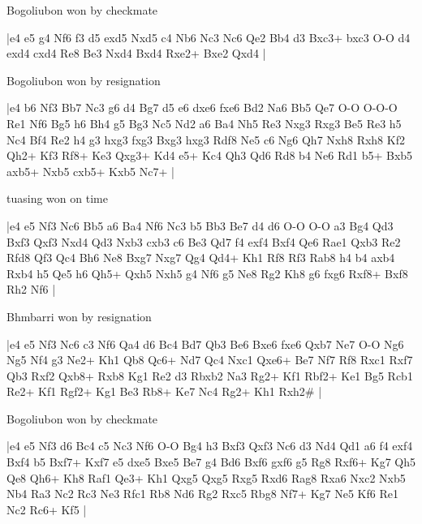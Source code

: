 \showboard

Bogoliubon won by checkmate

\makegametitle
|e4 e5 g4 Nf6 f3 d5 exd5 Nxd5 c4 Nb6 Nc3 Nc6 Qe2 Bb4 d3 Bxc3+ bxc3 O-O d4 exd4 cxd4 Re8 Be3 Nxd4 Bxd4 Rxe2+ Bxe2 Qxd4  |

\showboard

Bogoliubon won by resignation

\makegametitle
|e4 b6 Nf3 Bb7 Nc3 g6 d4 Bg7 d5 e6 dxe6 fxe6 Bd2 Na6 Bb5 Qe7 O-O O-O-O Re1 Nf6 Bg5 h6 Bh4 g5 Bg3 Nc5 Nd2 a6 Ba4 Nh5 Re3 Nxg3 Rxg3 Be5 Re3 h5 Nc4 Bf4 Re2 h4 g3 hxg3 fxg3 Bxg3 hxg3 Rdf8 Ne5 c6 Ng6 Qh7 Nxh8 Rxh8 Kf2 Qh2+ Kf3 Rf8+ Ke3 Qxg3+ Kd4 e5+ Kc4 Qh3 Qd6 Rd8 b4 Ne6 Rd1 b5+ Bxb5 axb5+ Nxb5 cxb5+ Kxb5 Nc7+  |

\showboard

tuasing won on time

\makegametitle
|e4 e5 Nf3 Nc6 Bb5 a6 Ba4 Nf6 Nc3 b5 Bb3 Be7 d4 d6 O-O O-O a3 Bg4 Qd3 Bxf3 Qxf3 Nxd4 Qd3 Nxb3 cxb3 c6 Be3 Qd7 f4 exf4 Bxf4 Qe6 Rae1 Qxb3 Re2 Rfd8 Qf3 Qc4 Bh6 Ne8 Bxg7 Nxg7 Qg4 Qd4+ Kh1 Rf8 Rf3 Rab8 h4 b4 axb4 Rxb4 h5 Qe5 h6 Qh5+ Qxh5 Nxh5 g4 Nf6 g5 Ne8 Rg2 Kh8 g6 fxg6 Rxf8+ Bxf8 Rh2 Nf6  |

\showboard

Bhmbarri won by resignation

\makegametitle
|e4 e5 Nf3 Nc6 c3 Nf6 Qa4 d6 Bc4 Bd7 Qb3 Be6 Bxe6 fxe6 Qxb7 Ne7 O-O Ng6 Ng5 Nf4 g3 Ne2+ Kh1 Qb8 Qc6+ Nd7 Qc4 Nxc1 Qxe6+ Be7 Nf7 Rf8 Rxc1 Rxf7 Qb3 Rxf2 Qxb8+ Rxb8 Kg1 Re2 d3 Rbxb2 Na3 Rg2+ Kf1 Rbf2+ Ke1 Bg5 Rcb1 Re2+ Kf1 Rgf2+ Kg1 Be3 Rb8+ Ke7 Nc4 Rg2+ Kh1 Rxh2\#  |

\showboard

Bogoliubon won by checkmate

\makegametitle
|e4 e5 Nf3 d6 Bc4 c5 Nc3 Nf6 O-O Bg4 h3 Bxf3 Qxf3 Nc6 d3 Nd4 Qd1 a6 f4 exf4 Bxf4 b5 Bxf7+ Kxf7 e5 dxe5 Bxe5 Be7 g4 Bd6 Bxf6 gxf6 g5 Rg8 Rxf6+ Kg7 Qh5 Qe8 Qh6+ Kh8 Raf1 Qe3+ Kh1 Qxg5 Qxg5 Rxg5 Rxd6 Rag8 Rxa6 Nxc2 Nxb5 Nb4 Ra3 Nc2 Rc3 Ne3 Rfc1 Rb8 Nd6 Rg2 Rxc5 Rbg8 Nf7+ Kg7 Ne5 Kf6 Re1 Nc2 Rc6+ Kf5  |

